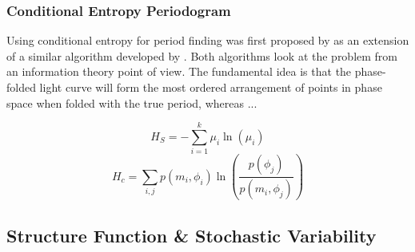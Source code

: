 

\subsubsection{Conditional Entropy Periodogram}
\label{subsubsec:conditional-entropy}

Using conditional entropy for period finding was first proposed by \citet{graham2013} as an extension of a similar algorithm developed by \citet{cincotta1995}. Both algorithms look at the problem from an information theory point of view. The fundamental idea is that the phase-folded light curve will form the most ordered arrangement of points in phase space when folded with the true period, whereas ...

\begin{equation}
H_S = - \sum_{i=1}^k \mu_i \ln(\mu_i)
\end{equation}
\begin{equation}
H_c = \sum_{i,j} p(m_i, \phi_i) \ln(\frac{p(\phi_j)}{p(m_i, \phi_j)})
\end{equation}



\subsection{Structure Function \& Stochastic Variability}
\label{subsec:structure-function}

